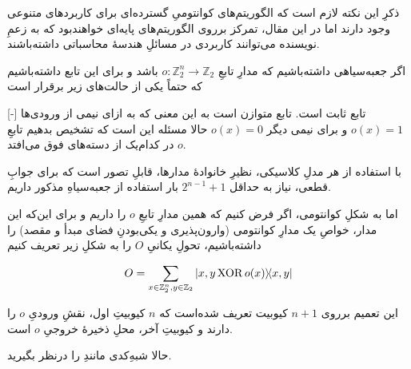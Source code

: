 
ذکرِ این نکته لازم است که الگوریتم‌های کوانتومیِ گسترده‌ای برای کاربردهای متنوعی وجود دارند
 اما در این مقال، تمرکز برروی الگوریتم‌های پایه‌ای خواهندبود که به زعمِ نویسنده می‌توانند کاربردی در مسائلِ هندسهٔ محاسباتی داشته‌باشند.



اگر جعبه‌سیاهی
 داشته‌باشیم که مدارِ تابعِ 
\( o : \mathbb{Z}_2^n \to \mathbb{Z}_2 \)
باشد و برای این تابع داشته‌باشیم که حتماً یکی از حالت‌های زیر برقرار است

[-]
 تابع ثابت است.
 تابع متوازن است به این معنی که به ازای نیمی از ورودی‌ها 
\( o(x) = 1 \)
و برای نیمی دیگر
\( o(x) = 0 \)
حالا مسئله این است که تشخیص بدهیم تابعِ \(o\) در کدام‌یک از دسته‌های فوق می‌افتد.

با استفاده از هر مدلِ  کلاسیکی، نظیرِ خانوادهٔ مدارها، قابلِ تصور است که برای جوابِ قطعی، نیاز به حداقل
\(2^{n-1}+1\)
بار استفاده از جعبه‌سیاهِ مذکور داریم.

اما به شکلِ کوانتومی، اگر فرض کنیم که همین مدارِ تابعِ \(o\) را داریم و برای این‌که این مدار، خواصِ یک مدارِ کوانتومی (وارون‌پذیری و یکی‌بودنِ فضای مبدأ و مقصد) را داشته‌باشیم، تحولِ یکانیِ \(O\) را به شکلِ زیر تعریف کنیم

\begin{equation}
    O = \sum_{x \in \mathbb{Z}_2^n, y \in \mathbb{Z}_2} \dyad{x, y \XOR o(x)}{x, y}
\end{equation} 

این تعمیم برروی \(n+1\) کیوبیت تعریف شده‌است که \(n\) کیوبیتِ اول، نقشِ ورودیِ \(o\) را دارند و کیوبیتِ آخر، محلِ ذخیرهٔ خروجیِ \(o\) است.

حالا شبهِ‌کدی مانندِ  را درنظر بگیرید.

